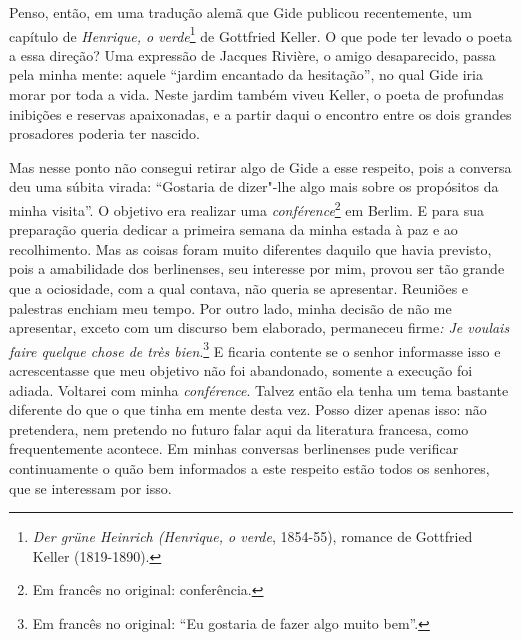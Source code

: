 Penso, então, em uma tradução alemã que Gide publicou recentemente, um
capítulo de \emph{Henrique, o verde}\footnote{\emph{Der grüne
  Heinrich (\emph{Henrique, o verde}}, 1854-55), romance de Gottfried Keller
  (1819-1890). \versal{[N. E.]}} de Gottfried Keller. O que pode ter levado o poeta a
essa direção? Uma expressão de Jacques Rivière, o amigo desaparecido,
passa pela minha mente: aquele ``jardim encantado da hesitação'', no
qual Gide iria morar por toda a vida. Neste jardim também viveu Keller,
o poeta de profundas inibições e reservas apaixonadas, e a partir daqui
o encontro entre os dois grandes prosadores poderia ter nascido.

Mas nesse ponto não consegui retirar algo de Gide a esse
respeito, pois a conversa deu uma súbita virada: ``Gostaria de dizer"-lhe
algo mais sobre os propósitos da minha visita''. O objetivo era realizar
uma \emph{conférence}\footnote{Em francês no original: conferência. \versal{[N. T.]}} em Berlim. E para sua preparação queria dedicar a
primeira semana da minha estada à paz e ao recolhimento. Mas as
coisas foram muito diferentes daquilo que havia previsto, pois a
amabilidade dos berlinenses, seu interesse por mim, provou ser tão
grande que a ociosidade, com a qual contava, não queria se apresentar.
Reuniões e palestras enchiam meu tempo. Por
outro lado, minha decisão de não me apresentar, exceto com um discurso
bem elaborado, permaneceu firme\emph{: Je voulais faire quelque chose de
très bien}.\footnote{Em francês no original: ``Eu gostaria de fazer algo muito bem''. \versal{[N. T.]}}
E ficaria contente se o senhor informasse isso e acrescentasse que
meu objetivo não foi abandonado, somente a execução foi adiada. Voltarei com minha \emph{conférence}.
Talvez então ela tenha um tema bastante diferente do que o que tinha em
mente desta vez. Posso dizer apenas isso: não pretendera, nem pretendo
no futuro falar aqui da literatura francesa, como frequentemente
acontece. Em minhas conversas berlinenses pude verificar continuamente
o quão bem informados a este respeito estão todos os senhores, que se
interessam por isso.

